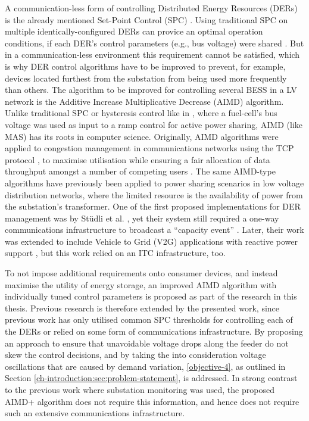 A communication-less form of controlling Distributed Energy Resources (DERs) is the already mentioned Set-Point Control (SPC) \cite{Leadbetter2012}.
Using traditional SPC on multiple identically-configured DERs can provice an optimal operation conditions, if each DER's control parameters (e.g., bus voltage) were shared \cite{Thieblemont2017a}.
But in a communication-less environment this requirement cannot be satisfied, which is why DER control algorithms have to be improved to prevent, for example, devices located furthest from the substation from being used more frequently than others.
The algorithm to be improved for controlling several BESS in a LV network is the Additive Increase Multiplicative Decrease (AIMD) algorithm.
Unlike traditional SPC or hysteresis control like in \cite{Jiang2007}, where a fuel-cell's bus voltage was used as input to a ramp control for active power sharing, AIMD (like MAS) has its roots in computer science.
Originally, AIMD algorithms were applied to congestion management in communications networks using the TCP protocol \cite{Chiu1989}, to maximise utilisation while ensuring a fair allocation of data throughput amongst a number of competing users \cite{Wirth2014}.
The same AIMD-type algorithms have previously been applied to power sharing scenarios in low voltage distribution networks, where the limited resource is the availability of power from the substation's transformer.
One of the first proposed implementations for DER management was by St{\"{u}}dli et al. \cite{Studli2012}, yet their system still required a one-way communications infrastructure to broadcast a ``capacity event'' \cite{Studli2014, Studli2014a}.
Later, their work was extended to include Vehicle to Grid (V2G) applications with reactive power support \cite {Studli2015}, but this work relied on an ITC infrastructure, too.

To not impose additional requirements onto consumer devices, and instead maximise the utility of energy storage, an improved AIMD algorithm with individually tuned control parameters is proposed as part of the research in this thesis.
Previous research is therefore extended by the presented work, since previous work has only utilised common SPC thresholds for controlling each of the DERs or relied on some form of communications infrastructure.
By proposing an approach to ensure that unavoidable voltage drops along the feeder do not skew the control decisions, and by taking the into consideration voltage oscillations that are caused by demand variation, \ref{objective-4}, as outlined in Section \ref{ch-introduction:sec:problem-statement}, is addressed.
In strong contrast to the previous work where substation monitoring was used, the proposed AIMD+ algorithm does not require this information, and hence does not require such an extensive communications infrastructure.

